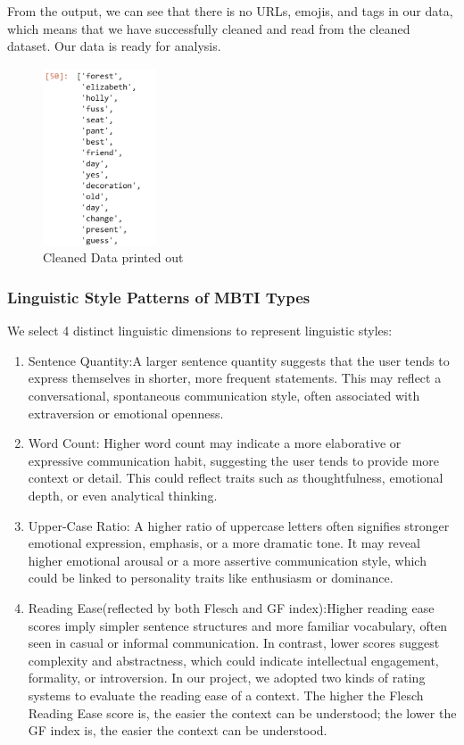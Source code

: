 \documentclass[12pt]{article}
\begin{document}
	From the output, we can see that there is no URLs, emojis, and tags in our data, which means that we have successfully cleaned and read from the cleaned dataset. Our data is ready for analysis.
	\begin{figure}[H]
		\centering
		\includegraphics[width=0.3\textwidth]{Q2VADER1} 
		\caption{Cleaned Data printed out}		
	\end{figure}
	
	\subsubsection{Linguistic Style Patterns of MBTI Types}
	We select 4 distinct linguistic dimensions to represent linguistic styles:
	\begin{enumerate}
		\item Sentence Quantity:A larger sentence quantity suggests that the user tends to express themselves in shorter, more frequent statements. This may reflect a conversational, spontaneous communication style, often associated with extraversion or emotional openness.  
		\item Word Count: Higher word count may indicate a more elaborative or expressive communication habit, suggesting the user tends to provide more context or detail. This could reflect traits such as thoughtfulness, emotional depth, or even analytical thinking.
		\item Upper-Case Ratio: A higher ratio of uppercase letters often signifies stronger emotional expression, emphasis, or a more dramatic tone. It may reveal higher emotional arousal or a more assertive communication style, which could be linked to personality traits like enthusiasm or dominance.
		\item Reading Ease(reflected by both Flesch and GF index):Higher reading ease scores imply simpler sentence structures and more familiar vocabulary, often seen in casual or informal communication. In contrast, lower scores suggest complexity and abstractness, which could indicate intellectual engagement, formality, or introversion. In our project, we adopted two kinds of rating systems to evaluate the reading ease of a context. The higher the Flesch Reading Ease score is, the easier the context can be understood; the lower the GF index is, the easier the context can be understood.
	\end{enumerate}
	
\end{document}

